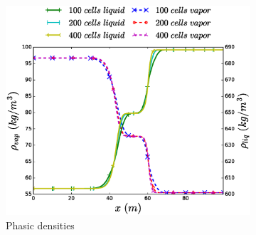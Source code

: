 \documentclass{inputs/mc2015}
\begin{document}
%        
%
\begin{figure}[H]
        \vspace{-1 mm}
        \centering
        \begin{subfigure}[b]{0.49\textwidth}
                \centering
                \includegraphics[width=\textwidth]{figures/two-phase-shock-tube-hem-density-plot.eps}                
                \caption{Phasic densities}
                \label{fig:2p-shock-tube-plots-rho-hem-sa}
        \end{subfigure}%
        \begin{subfigure}[b]{0.435\textwidth}
                \centering

\end{subfigure}
\end{figure}
\end{document}
